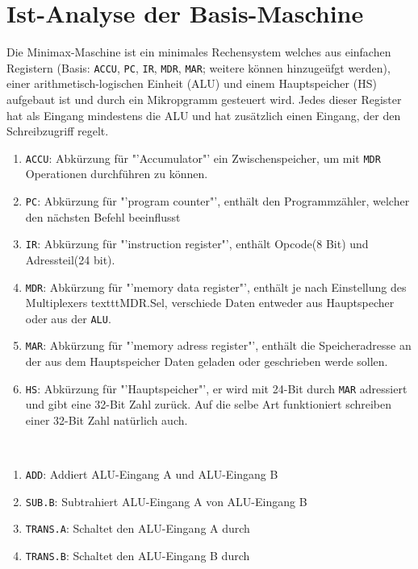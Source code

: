 \documentclass[12pt,titlepage]{article}
\begin{document}
\newpage

\section{Ist-Analyse der Basis-Maschine}

Die Minimax-Maschine ist ein minimales Rechensystem welches aus einfachen Registern (Basis: \texttt{ACCU}, \texttt{PC}, \texttt{IR}, \texttt{MDR}, \texttt{MAR};
weitere k{\"o}nnen hinzuge{\"u}fgt werden), einer arithmetisch-logischen Einheit (ALU) und einem Hauptspeicher (HS) aufgebaut
ist und durch ein Mikropgramm gesteuert wird. Jedes dieser Register hat als Eingang mindestens die ALU und hat zusätzlich einen Eingang, der den Schreibzugriff regelt.\\
\begin{enumerate}
\item \texttt{ACCU}: Abk{\"u}rzung f{\"u}r "'Accumulator"' ein Zwischenspeicher, um mit \texttt{MDR} Operationen durchführen zu k{\"o}nnen.
\item \texttt{PC}: Abk{\"u}rzung f{\"u}r "'program counter"', enthält den Programmzähler, welcher den nächsten Befehl beeinflusst
\item \texttt{IR}: Abk{\"u}rzung f{\"u}r "'instruction register"', enthält Opcode(8 Bit) und Adressteil(24 bit).
\item \texttt{MDR}: Abk{\"u}rzung f{\"u}r "'memory data register"', enthält je nach Einstellung des Multiplexers texttt{MDR.Sel}, verschiede Daten entweder aus Hauptspecher oder aus der \texttt{ALU}.
\item \texttt{MAR}: Abk{\"u}rzung f{\"u}r "'memory adress register"', enth{\"a}lt die Speicheradresse an der aus dem Hauptspeicher Daten geladen oder geschrieben werde sollen.
\item \texttt{HS}: Abk{\"u}rzung f{\"u}r "'Hauptspeicher"', er wird mit 24-Bit durch \texttt{MAR} adressiert und gibt eine 32-Bit Zahl zur{\"u}ck. Auf die selbe Art funktioniert schreiben einer 32-Bit Zahl nat{\"u}rlich auch.
\end{enumerate}

\leavevmode \\

\begin{enumerate}
\item \texttt{ADD}: Addiert ALU-Eingang A und ALU-Eingang B
\item \texttt{SUB.B}: Subtrahiert ALU-Eingang A von ALU-Eingang B
\item \texttt{TRANS.A}: Schaltet den ALU-Eingang A durch
\item \texttt{TRANS.B}: Schaltet den ALU-Eingang B durch
\end{enumerate}
\end{document}
